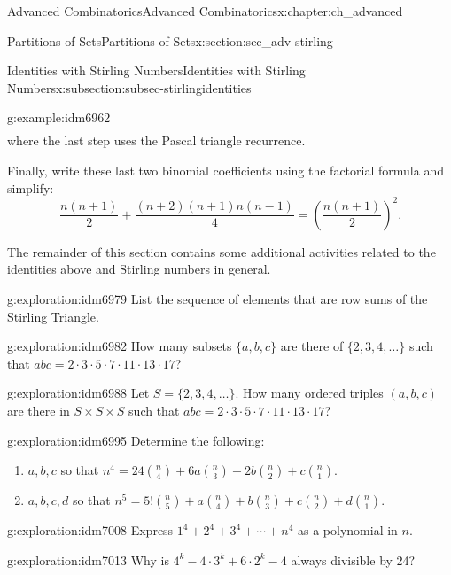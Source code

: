 \documentclass[oneside,10pt,]{book}
\numberwithin{equation}{chapter}
\begin{document}
\begin{chapterptx}{Advanced Combinatorics}{}{Advanced Combinatorics}{}{}{x:chapter:ch_advanced}
\begin{sectionptx}{Partitions of Sets}{}{Partitions of Sets}{}{}{x:section:sec_adv-stirling}
\begin{subsectionptx}{Identities with Stirling Numbers}{}{Identities with Stirling Numbers}{}{}{x:subsection:subsec-stirlingidentities}
\begin{example}{}{g:example:idm6962}
\begin{align*}
\end{align*}
where the last step uses the Pascal triangle recurrence.%
\par
Finally, write these last two binomial coefficients using the factorial formula and simplify:%
\begin{equation*}
\frac{n(n+1)}{2} + \frac{(n+2)(n+1)n(n-1)}{4} = \left(\frac{n(n+1)}{2}\right)^2\text{.}
\end{equation*}
%
\end{example}
The remainder of this section contains some additional activities related to the identities above and Stirling numbers in general.%
\begin{exploration}{}{g:exploration:idm6979}%
List the sequence of elements that are row sums of the Stirling Triangle.%
\end{exploration}
\begin{exploration}{}{g:exploration:idm6982}%
How many subsets \(\{a,b,c\}\) are there of \(\{2,3,4,\ldots\}\) such that \(abc = 2 \cdot 3 \cdot 5 \cdot 7 \cdot 11 \cdot 13 \cdot 17\)?%
\end{exploration}
\begin{exploration}{}{g:exploration:idm6988}%
Let \(S = \{2,3,4,\ldots\}\).  How many ordered triples \((a,b,c)\) are there in \(S\times S \times S\) such that \(abc = 2 \cdot 3 \cdot 5 \cdot 7 \cdot 11 \cdot 13 \cdot 17\)?%
\end{exploration}
\begin{exploration}{}{g:exploration:idm6995}%
Determine the following:%
\begin{enumerate}[font=\bfseries,label=(\alph*),ref=\alph*]
\item{}\(a, b, c\) so that \(n^4 = 24\binom{n}{4} + 6a\binom{n}{3}+2b\binom{n}{2} + c \binom{n}{1}\).%
\item{}\(a, b, c, d\) so that \(n^5 = 5!\binom{n}{5} + a\binom{n}{4} + b\binom{n}{3} + c \binom{n}{2} + d \binom{n}{1}\).%
\end{enumerate}
\end{exploration}
\begin{exploration}{}{g:exploration:idm7008}%
Express \(1^4 + 2^4 + 3^4 + \cdots + n^4\) as a polynomial in \(n\).%
\end{exploration}
\begin{exploration}{}{g:exploration:idm7013}%
Why is \(4^k - 4\cdot 3^k + 6\cdot 2^k - 4\) always divisible by 24?%
\end{exploration}
\end{subsectionptx}
%
%
\typeout{************************************************}

\end{sectionptx}
\end{chapterptx}
\end{document}
